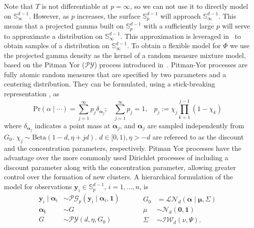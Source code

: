 Note that $T$ is not differentiable at $p = \infty$, so we can not use it to 
    directly model on ${\mathbb S}_{\infty}^{d-1}$. However, as $p$ increases,
    the surface $\mathbb{S}_p^{d-1}$ will approach $\mathbb{S}_{\infty}^{d-1}$.
    This means that a projected gamma built on $\mathbb{S}_p^{d-1}$ with a
    sufficiently large $p$ will serve to approximate a distribution on 
    $\mathbb{S}_{\infty}^{d-1}$.  This approximation is leveraged 
    in~\cite{trubey:pg} to obtain samples of a distribution on 
    ${\mathbb S}_{\infty}^{d-1}$. To obtain a flexible model for $\Phi$ we use 
    the projected gamma density as the kernel of a random measure mixture model, 
    based on the Pitman Yor ($\mathcal{PY}$) process introduced 
    in~\cite{perman1992}. Pitman-Yor processes are fully atomic random 
    measures that are specified by two parameters and a centering distribution.
    They can be formulated, using a stick-breaking representation 
    \citep{Ish-James2001}, as
    \[
        \text{Pr}(\alpha\mid\cdots) = \sum_{j = 1}^{\infty}p_j\delta_{\bm{\alpha}_j};
        \;\;\;\sum_{j = 1}^{\infty}p_j = 1, \;\;\; p_j := \chi_j \prod_{k = 1}^{j-1}(1 - \chi_k)
    \]
    where $\delta_{\bm{\alpha}_j}$ indicates a point mass at $\bm{\alpha}_j$,
    and $\bm{\alpha}_j$ are sampled independently from $G_0$. $\chi_j \sim \text{Beta}(1 - d,
    \eta+jd)$. $d\in[0,1), \eta>-d$ are refereed to as the discount and the concentration 
    parameters, respectively. Pitman Yor processes have the advantage over the more 
    commonly used Dirichlet processes \citep{Ferguson74} of including a 
    discount parameter along with the concentration parameter, allowing greater 
    control over the formation of new clusters.  A hierarchical formulation of 
    the model for observations 
    $\bm{y}_i\in \mathbb{S}_{p}^{d-1}$, $i=1,\ldots,n$, is
    \begin{equation}
        \label{eqn:modelsphere}
        \begin{aligned}
        \bm{y}_i \mid \bm{\alpha}_i &\sim \mathcal{PG}_p
                \left(\bm{y}_i\mid\bm{\alpha}_i, \bm{1}\right)\\
        \bm{\alpha_i} &\sim G\\
        G &\sim \mathcal{PY}\left(d, \eta, G_0\right)\\
        \end{aligned}
        ~\hspace{1cm}
        \begin{aligned}
        G_0 &= \mathcal{LN}_d\left(\bm{\alpha}\mid\bm{\mu},\Sigma\right)\\
        \mu &\sim \mathcal{N}_d\left(\bm{0},\bm{1}\right)\\
        \Sigma &\sim \mathcal{IW}_d\left(\nu, \Psi\right).
        \end{aligned}
    \end{equation}
